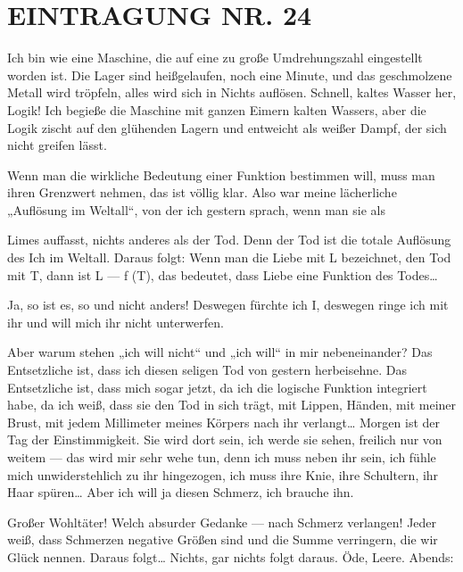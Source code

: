 \section{EINTRAGUNG NR. 24}

Ich bin wie eine Maschine, die auf eine zu große Umdrehungszahl
eingestellt worden ist. Die Lager sind heißgelaufen, noch eine
Minute, und das geschmolzene Metall wird tröpfeln, alles wird sich
in Nichts auflösen. Schnell, kaltes Wasser her, Logik! Ich begieße
die Maschine mit ganzen Eimern kalten Wassers, aber die Logik
zischt auf den glühenden Lagern und entweicht als weißer Dampf, der
sich nicht greifen lässt.

Wenn man die wirkliche Bedeutung einer Funktion bestimmen will,
muss man ihren Grenzwert nehmen, das ist völlig klar. Also war
meine lächerliche „Auflösung im Weltall“, von der ich gestern
sprach, wenn man sie als

Limes auffasst, nichts anderes als der Tod. Denn der Tod ist die
totale Auflösung des Ich im Weltall. Daraus folgt: Wenn man die
Liebe mit L bezeichnet, den Tod mit T, dann ist L — f (T), das
bedeutet, dass Liebe eine Funktion des Todes\ldots{}

Ja, so ist es, so und nicht anders! Deswegen fürchte ich I,
deswegen ringe ich mit ihr und will mich ihr nicht unterwerfen.

Aber warum stehen „ich will nicht“ und „ich will“ in mir
nebeneinander? Das Entsetzliche ist, dass ich diesen seligen Tod
von gestern herbeisehne. Das Entsetzliche ist, dass mich sogar
jetzt, da ich die logische Funktion integriert habe, da ich weiß,
dass sie den Tod in sich trägt, mit Lippen, Händen, mit meiner
Brust, mit jedem Millimeter meines Körpers nach ihr verlangt\ldots{}
Morgen ist der Tag der Einstimmigkeit. Sie wird dort sein, ich
werde sie sehen, freilich nur von weitem — das wird mir sehr wehe
tun, denn ich muss neben ihr sein, ich fühle mich unwiderstehlich
zu ihr hingezogen, ich muss ihre Knie, ihre Schultern, ihr Haar
spüren\ldots{} Aber ich will ja diesen Schmerz, ich brauche ihn.

Großer Wohltäter! Welch absurder Gedanke — nach Schmerz verlangen!
Jeder weiß, dass Schmerzen negative Größen sind und die Summe
verringern, die wir Glück nennen. Daraus folgt\ldots{} Nichts, gar
nichts folgt daraus. Öde, Leere. Abends:

